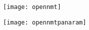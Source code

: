 \begin{frame}
  \begin{center}
    \texttt{[image: opennmt]}
  \end{center}
\end{frame}


\begin{frame}
  \begin{center}
    \hspace*{-7cm}\texttt{[image: opennmtpanaram]}
  \end{center}
\end{frame}













